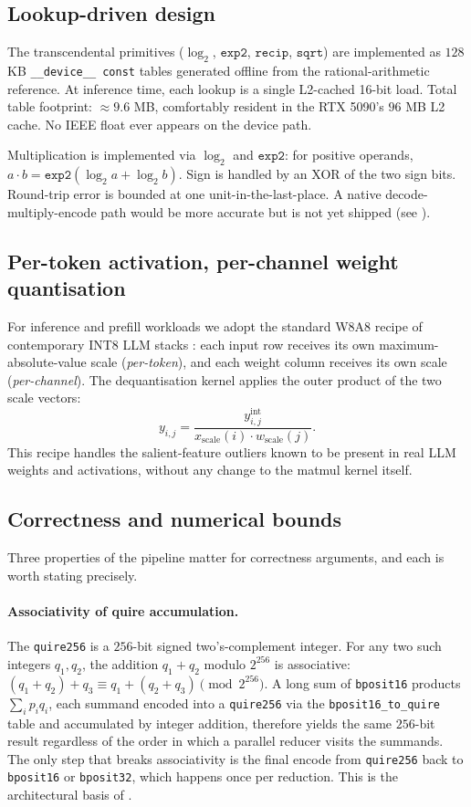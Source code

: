 \documentclass[11pt,a4paper]{article}
\newcommand{\bpsixteen}{\texttt{bposit16}}
\newcommand{\bpthirtytwo}{\texttt{bposit32}}
\newcommand{\quireTSF}{\texttt{quire256}}
\begin{document}
\subsection{Lookup-driven design}

The transcendental primitives ($\log_2$, $\texttt{exp2}$, $\texttt{recip}$,
$\texttt{sqrt}$) are implemented as $128$ KB \texttt{\_\_device\_\_
const} tables generated offline from the rational-arithmetic reference.
At inference time, each lookup is a single L2-cached 16-bit load.
Total table footprint: $\approx 9.6$ MB, comfortably resident in the
RTX 5090's $96$ MB L2 cache. No IEEE float ever appears on the device
path.

Multiplication is implemented via $\log_2$ and $\texttt{exp2}$: for
positive operands, $a \cdot b = \texttt{exp2}(\log_2 a + \log_2 b)$.
Sign is handled by an XOR of the two sign bits. Round-trip error is
bounded at one unit-in-the-last-place. A native decode-multiply-encode
path would be more accurate but is not yet shipped (see
).

\subsection{Per-token activation, per-channel weight quantisation}

For inference and prefill workloads we adopt the standard W8A8
recipe of contemporary INT8 LLM stacks
\cite{smoothquant, awq}: each input row receives its own
maximum-absolute-value scale (\emph{per-token}), and each weight
column receives its own scale (\emph{per-channel}). The dequantisation
kernel applies the outer product of the two scale vectors:
\[
    y_{i,j} = \frac{y^{\mathrm{int}}_{i,j}}{x_{\mathrm{scale}}(i) \cdot w_{\mathrm{scale}}(j)} .
\]
This recipe handles the salient-feature outliers known to be present
in real LLM weights and activations, without any change to the matmul
kernel itself.

\subsection{Correctness and numerical bounds}
\label{sec:correctness}

Three properties of the pipeline matter for correctness arguments,
and each is worth stating precisely.

\paragraph{Associativity of quire accumulation.} The \quireTSF{} is a
$256$-bit signed two's-complement integer. For any two such integers
$q_1, q_2$, the addition $q_1 + q_2$ modulo $2^{256}$ is associative:
$(q_1 + q_2) + q_3 \equiv q_1 + (q_2 + q_3) \pmod{2^{256}}$.
A long sum of \bpsixteen{} products $\sum_i p_i q_i$, each summand
encoded into a \quireTSF{} via the \texttt{bposit16\_to\_quire} table
and accumulated by integer addition, therefore yields the same
$256$-bit result regardless of the order in which a parallel reducer
visits the summands. The only step that breaks associativity is the
final encode from \quireTSF{} back to \bpsixteen{} or \bpthirtytwo{},
which happens once per reduction. This is the architectural basis of
.
\end{document}
